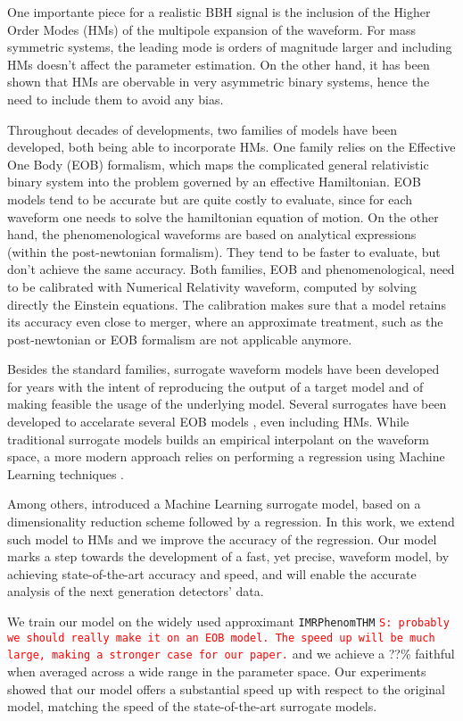 \documentclass[twocolumn,showpacs,preprintnumbers,nofootinbib,prd,
superscriptaddress,10pt]{revtex4-1}
\newcommand{\stefano}[1]{{\textcolor{red}{\texttt{S: #1}} }}
\begin{document}
One importante piece for a realistic BBH signal is the inclusion of the Higher Order Modes (HMs) of the multipole expansion of the waveform. For mass symmetric systems, the leading mode is orders of magnitude larger and including HMs doesn't affect the parameter estimation. On the other hand, it has been shown \cite{} that HMs are obervable in very asymmetric binary systems, hence the need to include them to avoid any bias.

Throughout decades of developments, two families of models have been developed, both being able to incorporate HMs.
One family relies on the Effective One Body (EOB) formalism, which maps the complicated general relativistic binary system into the problem governed by an effective Hamiltonian. EOB models tend to be accurate but are quite costly to evaluate, since for each waveform one needs to solve the hamiltonian equation of motion.
On the other hand, the phenomenological waveforms are based on analytical expressions (within the post-newtonian formalism). They tend to be faster to evaluate, but don't achieve the same accuracy.
Both families, EOB and phenomenological, need to be calibrated with Numerical Relativity waveform, computed by solving directly the Einstein equations. The calibration makes sure that a model retains its accuracy even close to merger, where an approximate treatment, such as the post-newtonian or EOB formalism are not applicable anymore.

Besides the standard families, surrogate waveform models have been developed for years with the intent of reproducing the output of a target model and of making feasible the usage of the underlying model. Several surrogates have been developed to accelarate several EOB models \cite{}, even including HMs. While traditional surrogate models \cite{} builds an empirical interpolant on the waveform space, a more modern approach relies on performing a regression using Machine Learning techniques \cite{}.

Among others, \cite{Schmidt:2020yuu} introduced a Machine Learning surrogate model, based on a dimensionality reduction scheme followed by a regression. In this work, we extend such model to HMs and we improve the accuracy of the regression. Our model marks a step towards the development of a fast, yet precise, waveform model, by achieving state-of-the-art accuracy and speed, and will enable the accurate analysis of the next generation detectors' data.

We train our model on the widely used approximant \texttt{IMRPhenomTHM} \stefano{probably we should really make it on an EOB model. The speed up will be much large, making a stronger case for our paper.} and we achieve a ??\% faithful when averaged across a wide range in the parameter space.
Our experiments showed that our model offers a substantial speed up with respect to the original model, matching the speed of the state-of-the-art surrogate models.
\end{document}

